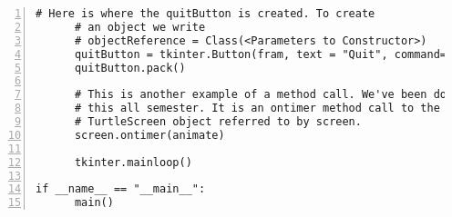 \begin{lstlisting}[basicstyle=\ttfamily\scriptsize,numbers=left]
      # Here is where the quitButton is created. To create
      # an object we write
      # objectReference = Class(<Parameters to Constructor>)
      quitButton = tkinter.Button(fram, text = "Quit", command=quitHandler)
      quitButton.pack()

      # This is another example of a method call. We've been doing 
      # this all semester. It is an ontimer method call to the 
      # TurtleScreen object referred to by screen.
      screen.ontimer(animate)

      tkinter.mainloop()

if __name__ == "__main__":
      main()
\end{lstlisting}